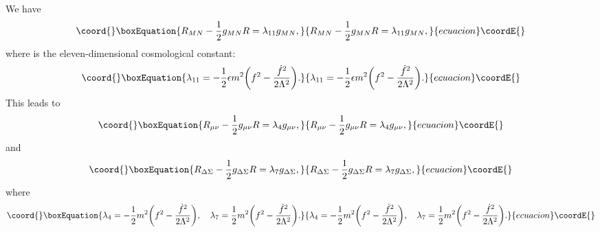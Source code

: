 \documentclass[a4paper,12pt]{article}
\begin{document}
We have
\begin{equation}\coord{}\boxEquation{
R_{MN}-\frac{1}{2}g_{MN}R=\lambda_{11} g_{MN},
}{
R_{MN}-\frac{1}{2}g_{MN}R=\lambda_{11} g_{MN},
}{ecuacion}\coordE{}\end{equation}
where \coordHE{} is the eleven-dimensional cosmological constant:
\begin{equation}\coord{}\boxEquation{
\lambda_{11}= -\frac{1}{2}\epsilon m^2\biggl(f^2-\frac{{\dot
f}^2}{2\Lambda^2}\biggr).
}{
\lambda_{11}= -\frac{1}{2}\epsilon m^2\biggl(f^2-\frac{{\dot
f}^2}{2\Lambda^2}\biggr).
}{ecuacion}\coordE{}\end{equation}
This leads to
\begin{equation}\coord{}\boxEquation{
\label{R1} R_{\mu\nu}-\frac{1}{2}g_{\mu\nu}R=\lambda_4g_{\mu\nu},
}{
R_{\mu\nu}-\frac{1}{2}g_{\mu\nu}R=\lambda_4g_{\mu\nu},
}{ecuacion}\coordE{}\end{equation} and
\begin{equation}\coord{}\boxEquation{
\label{R2}
R_{\Delta\Sigma}-\frac{1}{2}g_{\Delta\Sigma}R=\lambda_7g_{\Delta\Sigma},
}{
R_{\Delta\Sigma}-\frac{1}{2}g_{\Delta\Sigma}R=\lambda_7g_{\Delta\Sigma},
}{ecuacion}\coordE{}\end{equation}
where
\begin{equation}\coord{}\boxEquation{
\lambda_4=-\frac{1}{2}m^2\biggl(f^2-\frac{{\dot
f}^2}{2\Lambda^2}\biggr),\quad \lambda_7
=\frac{1}{2}m^2\biggl(f^2-\frac{{\dot f}^2}{2\Lambda^2}\biggr).
}{
\lambda_4=-\frac{1}{2}m^2\biggl(f^2-\frac{{\dot
f}^2}{2\Lambda^2}\biggr),\quad \lambda_7
=\frac{1}{2}m^2\biggl(f^2-\frac{{\dot f}^2}{2\Lambda^2}\biggr).
}{ecuacion}\coordE{}\end{equation}
\end{document}
